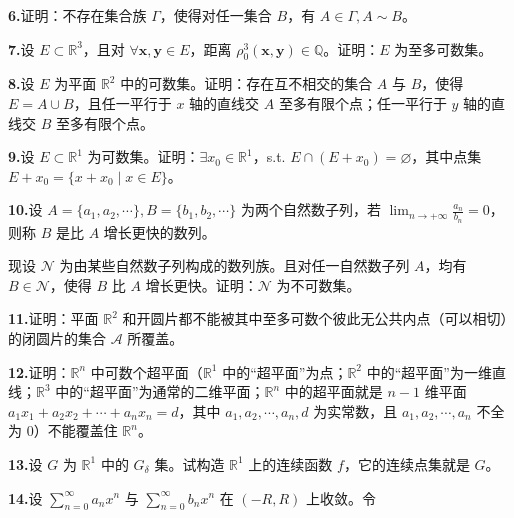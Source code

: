 \documentclass[11pt,a4paper]{article}
\begin{document}
\par{}\noindent\hypertarget{review-q6}{}\textbf{6.}\quad 证明：不存在集合族 $\Gamma$，使得对任一集合 $B$，有 $A\in\Gamma,A\sim B$。
\par{}\noindent\hypertarget{review-q7}{}\textbf{7.}\quad 设 $E\subset\mathbb R^3$，且对 $\forall\boldsymbol{x},\boldsymbol{y}\in E$，距离 $\rho_0^3(\boldsymbol{x},\boldsymbol{y})\in\mathbb Q$。证明：$E$ 为至多可数集。
\par{}\noindent\hypertarget{review-q8}{}\textbf{8.}\quad 设 $E$ 为平面 $\mathbb R^2$ 中的可数集。证明：存在互不相交的集合 $A$ 与 $B$，使得 $E=A\cup B$，且任一平行于 $x$ 轴的直线交 $A$ 至多有限个点；任一平行于 $y$ 轴的直线交 $B$ 至多有限个点。
\par{}\noindent\hypertarget{review-q9}{}\textbf{9.}\quad 设 $E\subset\mathbb R^1$ 为可数集。证明：$\exists x_0\in\mathbb R^1$，s.t. $E\cap(E+x_0)=\varnothing$，其中点集 $E+x_0=\{x+x_0\mid x\in E\}$。
\par{}\noindent\hypertarget{review-q10}{}\textbf{10.}\quad 设 $A=\{a_1,a_2,\cdots\},B=\{b_1,b_2,\cdots\}$ 为两个自然数子列，若 $\lim_{n\to+\infty}\frac{a_n}{b_n}=0$，则称 $B$ 是比 $A$ 增长更快的数列。
\par\noindent 现设 $\mathcal N$ 为由某些自然数子列构成的数列族。且对任一自然数子列 $A$，均有 $B\in\mathcal N$，使得 $B$ 比 $A$ 增长更快。证明：$\mathcal N$ 为不可数集。
\par{}\noindent\hypertarget{review-q11}{}\textbf{11.}\quad 证明：平面 $\mathbb R^2$ 和开圆片都不能被其中至多可数个彼此无公共内点（可以相切）的闭圆片的集合 $\mathcal A$ 所覆盖。
\par{}\noindent\hypertarget{review-q12}{}\textbf{12.}\quad 证明：$\mathbb R^n$ 中可数个超平面（$\mathbb R^1$ 中的“超平面”为点；$\mathbb R^2$ 中的“超平面”为一维直线；$\mathbb R^3$ 中的“超平面”为通常的二维平面；$\mathbb R^n$ 中的超平面就是 $n-1$ 维平面 $a_1x_1+a_2x_2+\cdots+a_nx_n=d$，其中 $a_1,a_2,\cdots,a_n,d$ 为实常数，且 $a_1,a_2,\cdots,a_n$ 不全为 $0$）不能覆盖住 $\mathbb R^n$。
\par{}\noindent\hypertarget{review-q13}{}\textbf{13.}\quad 设 $G$ 为 $\mathbb R^1$ 中的 $G_\delta$ 集。试构造 $\mathbb R^1$ 上的连续函数 $f$，它的连续点集就是 $G$。
\par{}\noindent\hypertarget{review-q14}{}\textbf{14.}\quad 设 $\sum_{n=0}^\infty a_nx^n$ 与 $\sum_{n=0}^\infty b_nx^n$ 在 $(-R,R)$ 上收敛。令
\end{document}
